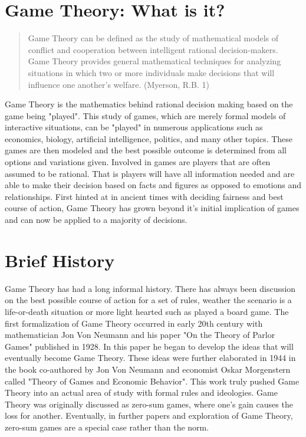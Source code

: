 \documentclass[12pt]{article}
\begin{document}
\pagestyle{fancy}  \chead{}
\lfoot{} \cfoot{} \rfoot{}

\section{Game Theory: What is it?}
 
\begin{quotation}
	 Game Theory can be defined as the study of mathematical models of
	conflict and cooperation between intelligent rational decision-makers.
	Game Theory provides general mathematical techniques for analyzing
	situations in which two or more individuals make decisions that will
	influence one another's welfare. (Myerson, R.B. 1)
\end{quotation}
	Game Theory is the mathematics behind rational decision making based on the game being "played". This study of games, which are merely formal models of interactive situations, can be "played" in numerous applications such as economics, biology, artificial intelligence, politics, and many other topics. These games are then modeled and the best possible outcome is determined from all options and variations given. Involved in games are players that are often assumed to be rational. That is players will have all information needed and are able to make their decision based on facts and figures as opposed to emotions and relationships. First hinted at in ancient times with deciding fairness and best course of action, Game Theory has grown beyond it's initial implication of games and can now be applied to a majority of decisions.
\section{Brief History}
	Game Theory has had a long informal history. There has always been discussion on the best possible course of action for a set of rules, weather the scenario is a life-or-death situation or more light hearted such as played a board game. The first formalization of Game Theory occurred in early 20th century with mathematician Jon Von Neumann and his paper "On the Theory of Parlor Games" published in 1928. In this paper he began to develop the ideas that will eventually become Game Theory. These ideas were further elaborated in 1944 in the book co-authored by Jon Von Neumann and economist Oskar Morgenstern called "Theory of Games and Economic Behavior". This work truly pushed Game Theory into an actual area of study with formal rules and ideologies. Game Theory was originally discussed as zero-sum games, where one's gain causes the loss for another. Eventually, in further papers and exploration of Game Theory, zero-sum games are a special case rather than the norm. 
\end{document}
